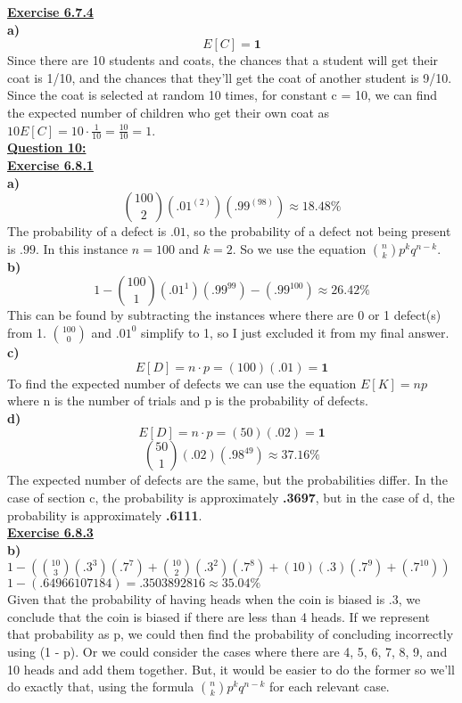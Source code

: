 \documentclass[12pt, letterpaper, twoside]{article}
\begin{document}
\break
\textbf{\underline{Exercise 6.7.4}}\\
\break
\textbf{a)}\\
\[E[C] = \mathbf{1}\]
Since there are 10 students and coats, the chances that a student will get their coat is 1/10, and the chances that they'll get the coat of another student is 9/10. Since the coat is selected at random 10 times, for constant c = 10, we can find the expected number of children who get their own coat as $10E[C] = 10\cdot \frac{1}{10} = \frac{10}{10} = 1$.\\
\newpage\noindent\textbf{\underline{Question 10:}}\\
\textbf{\underline{Exercise 6.8.1}}\\
\break
\textbf{a)}\\
\[\binom{100}{2}(.01^{(2)})(.99^{(98)}) \approx 18.48\%\]
The probability of a defect is $.01$, so the probability of a defect not being present is $.99$. In this instance $n = 100$ and $k = 2$. So we use the equation $\binom{n}{k}p^k q^{n-k}$.\\
\break
\textbf{b)}\\
\[1 - \binom{100}{1}(.01^1)(.99^{99}) - (.99^{100}) \approx 26.42\%\]
This can be found by subtracting the instances where there are 0 or 1 defect(s) from 1. $\binom{100}{0}$ and $.01^0$ simplify to 1, so I just excluded it from my final answer.\\
\break
\textbf{c)}\\
\[E[D] = n \cdot p = (100)(.01) = \mathbf{1}\]
To find the expected number of defects we can use the equation $E[K] = np$ where n is the number of trials and p is the probability of defects.\\ 
\break
\textbf{d)}\\
\[E[D] = n \cdot p = (50)(.02) = \mathbf{1}\]
\[\binom{50}{1}(.02)(.98^{49}) \approx \mathbf{37.16\%}\]
The expected number of defects are the same, but the probabilities differ. In the case of section c, the probability is approximately \textbf{.3697}, but in the case of d, the probability is approximately \textbf{.6111}.\\
\break
\newpage\noindent\textbf{\underline{Exercise 6.8.3}}\\
\break
\textbf{b)}\\
$1 - (\binom{10}{3}(.3^3) (.7^7) + \binom{10}{2}(.3^2)(.7^8) + (10)(.3)(.7^9) + (.7^{10}))$\\
$1 - (.64966107184) = .3503892816 \approx \mathbf{35.04\%}$\\
\break
Given that the probability of having heads when the coin is biased is .3, we conclude that the coin is biased if there are less than 4 heads. If we represent that probability as p, we could then find the probability of concluding incorrectly using (1 - p). Or we could consider the cases where there are 4, 5, 6, 7, 8, 9, and 10 heads and add them together. But, it would be easier to do the former so we'll do exactly that, using the formula $\binom{n}{k}p^k q^{n-k}$ for each relevant case.\\
\end{document}
